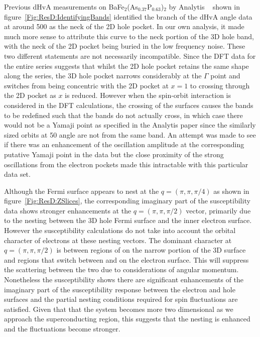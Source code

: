 Previous \ac{dHvA} measurements on BaFe$_2$(As$_{0.37}$P$_{0.63}$)$_2$ by Analytis \etal{}~\cite{Analytis2010c} shown in figure~\ref{Fig:ResD:IdentifyingBands} identified the branch of the \ac{dHvA} angle data at around \unit{500}{\tesla} as the neck of the 2D hole pocket. In our own analysis, it made much more sense to attribute this curve to the neck portion of the 3D hole band, with the neck of the 2D pocket being buried in the low frequency noise. These two different statements are not necessarily incompatible. Since the \ac{DFT} data for the entire series suggests that whilst the 2D hole pocket retains the same shape along the \BaFeAsP{} series, the 3D hole pocket narrows considerably at the $\Gamma$ point and switches from being concentric with the 2D pocket at $x=1$ to crossing through the 2D pocket as $x$ is reduced. However when the spin-orbit interaction is considered in the \ac{DFT} calculations, the crossing of the surfaces causes the bands to be redefined such that the bands do not actually cross, in which case there would not be a Yamaji point as specified in the Analytis paper since the similarly sized orbits at \unit{50}{\degree} angle are not from the same band. An attempt was made to see if there was an enhancement of the oscillation amplitude at the corresponding putative Yamaji point in the \BaFeP{} data but the close proximity of the strong oscillations from the electron pockets made this intractable with this particular data set.

Although the Fermi surface appears to nest at the $q=(\pi, \pi, \pi/4)$ as shown in figure~\ref{Fig:ResD:ZSlices}, the corresponding imaginary part of the susceptibility data shows stronger enhancements at the $q=(\pi, \pi, \pi/2)$ vector, primarily due to the nesting between the 3D hole Fermi surface and the inner electron surface. However the susceptibility calculations do not take into account the orbital character of electrons at these nesting vectors. The dominant character at $q=(\pi, \pi, \pi/2)$ is between regions of \DxzDyz{} on the narrow portion of the 3D surface and regions that switch between \Dxy and \DxzDyz{} on the electron surface. This will suppress the scattering between the two due to considerations of angular momentum. Nonetheless the susceptibility shows there are significant enhancements of the imaginary part of the susceptibility response between the electron and hole surfaces and the partial nesting conditions required for spin fluctuations are satisfied. Given that that the system becomes more two dimensional as we approach the superconducting region, this suggests that the nesting is enhanced and the fluctuations become stronger.

